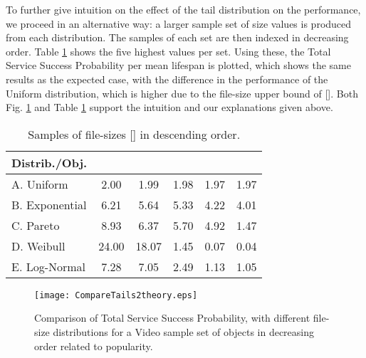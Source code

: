 \documentclass[conference]{IEEEtran}
\begin{document}
{\vspace{+0.5cm}
To further give intuition on the effect of the tail distribution on the performance, we proceed in an alternative way: a larger sample set of size  values is produced from each distribution. The samples of each set are then indexed in decreasing order. Table \ref{Tab3} shows the five highest values per set. Using these, the Total Service Success Probability per mean lifespan is plotted, which shows the same results as the expected case, with the difference in the performance of the Uniform distribution, which is higher due to the file-size upper bound of  []. Both Fig. \ref{fig:Vardec} and Table \ref{Tab3} support the intuition and our explanations given above. 











\begin{table}[ht!]
\normalsize
\caption{Samples of file-sizes [] in descending order.}
\vspace{+0.5cm}
 \centering
\begin{tabular}{|l|c|c|c|c|c|}
 \hline
Distrib./Obj. &  & & & &  \\ [1 ex]
 \hline
A. Uniform & 2.00 & 1.99 & 1.98 & 1.97 & 1.97 \\ [0.5 ex]
 \hline
B. Exponential & 6.21 & 5.64 & 5.33 & 4.22 & 4.01 \\ [0.5 ex]
\hline
C. Pareto & 8.93 & 6.37 & 5.70 & 4.92 & 1.47  \\ [0.5 ex]
\hline
D. Weibull & 24.00 & 18.07 & 1.45 & 0.07 & 0.04  \\ [0.5 ex]
\hline
E. Log-Normal & 7.28 & 7.05 & 2.49 & 1.13 & 1.05  \\ [0.5 ex]
\hline
\end{tabular}
\label{Tab3}
\end{table}



\begin{figure}[ht!]
\centering
\texttt{[image: CompareTails2theory.eps]}
\caption{Comparison of Total Service Success Probability, with different file-size distributions for a Video sample set of  objects in decreasing order related to popularity.}
\label{fig:Vardec}
\end{figure}


}
\end{document}
